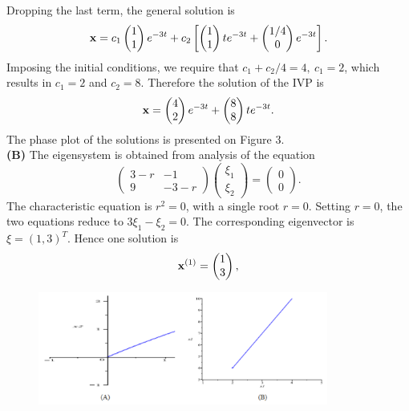 \documentclass[11pt,a4paper]{article}
\begin{document}
\begin{enumerate}
$$		$$
		Dropping the last term, the general solution is
		$$
		\vb{x} = c_1
		\begin{pmatrix}
			1\\
			1
		\end{pmatrix}e^{-3t} + c_2
		\left[
			\begin{pmatrix}
				1\\
				1
			\end{pmatrix}te^{-3t} +
			\begin{pmatrix}
				1/4\\
				0
			\end{pmatrix}e^{-3t}
		\right].
		$$
		Imposing the initial conditions, we require that $c_1 + c_2/4 = 4,\ c_1 = 2$, which results in $c_1 = 2$ and $c_2 = 8$. Therefore the solution of the IVP is
		$$
		\vb{x} =
		\begin{pmatrix}
			4\\
			2
		\end{pmatrix}e^{-3t} +
		\begin{pmatrix}
			8\\
			8
		\end{pmatrix}te^{-3t}.
		$$
		The phase plot of the solutions is presented on Figure 3.\\
		\textbf{(B)} The eigensystem is obtained from analysis of the equation
		$$
		\begin{pmatrix}
			3 - r & -1\\
			9 & -3 - r
		\end{pmatrix}
		\begin{pmatrix}
			\xi_1\\
			\xi_2
		\end{pmatrix} =
		\begin{pmatrix}
			0\\
			0
		\end{pmatrix}.
		$$
		The characteristic equation is $r^2 = 0$, with a single root $r = 0$. Setting $r = 0$, the two equations reduce to $3\xi_1 - \xi_2 = 0$. The corresponding eigenvector is $\xi = (1, 3)^T$. Hence one solution is
		$$
		\vb{x}^{(1)} =
		\begin{pmatrix}
			1\\
			3
		\end{pmatrix},
		$$
		\begin{figure}[H]
			\centering
			\includegraphics[width=0.85\textwidth]{figure/4_fig3.PNG}

\end{figure}
\end{enumerate}
\end{document}
